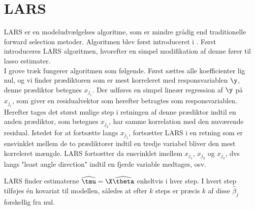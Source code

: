 \section{LARS}
LARS er en modeludvælgelses algoritme, som er mindre grådig end traditionelle forward selection metoder. 
Algoritmen blev først introduceret i \citep{efron}. 
Først introduceres LARS algoritmen, hvorefter en simpel modifikation af denne fører til lasso estimater. \\[2mm]
%
I grove træk fungerer algoritmen som følgende. 
Først sættes alle koefficienter lig nul, og vi finder prædiktoren som er mest korreleret med responsvariablen \(\y\), denne prædiktor betegnes \(x_{j_1}\).
Der udføres en simpel lineær regression af \(\y\) på \(x_{j_1}\), som giver en residualvektor som herefter betragtes som responsvariablen.
Herefter tages det størst mulige step i retningen af denne prædiktor indtil en anden prædiktor, som betegnes \(x_{j_2}\), har samme korrelation med den nuværende residual.
Istedet for at fortsætte langs \(x_{j_1}\), fortsætter LARS i en retning som er ensvinklet mellem de to prædiktorer indtil en tredje variabel bliver den mest korreleret mængde.
LARS fortsætter da ensvinklet imellem \(x_{j_1}\), \(x_{j_2}\) og \(x_{j_3}\), dvs langs "least angle direction" indtil en fjerde variable medtages, osv.

LARS finder estimaterne \(\widehat{\tmu} = \X \widehat{\tbeta}\) enkeltvis i hver step.
I hvert step tilføjes én kovariat til modellen, således at efter \(k\) steps er præcis \(k\) af disse \(\hat{\beta}_j\) forskellig fra nul.

